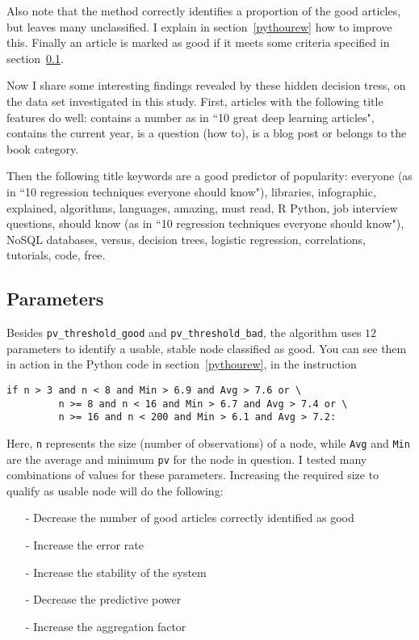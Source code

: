 \documentclass[oneside,10pt]{book}
\begin{document}
\noindent Also note that the method correctly identifies a proportion of the good articles, but leaves many unclassified. I explain in section~\ref{pythourew} 
 how to improve this. Finally an article is marked as good if it meets some criteria specified  in section~\ref{parambana}. 

Now I share some interesting findings revealed by these hidden decision tress, on the data set investigated in this study. First, articles with the following title features do well:
	contains a number as in ``10 great deep learning articles",
	contains the current year,
	is a question  (how to),
	is a blog post or belongs to the book category. 

Then the following title keywords are a good predictor of popularity:
	everyone (as in ``10 regression techniques everyone should know"),
	libraries,
	infographic,
	explained, 
	algorithms,
	languages, 
	amazing, 
	must read,
	R Python,
	job interview questions,
	should know (as in ``10 regression techniques everyone should know"),
	NoSQL databases,
	versus, 
	decision trees,
	logistic regression,
	correlations,
	tutorials,
	code, 
	free. 

\subsection{Parameters}\label{parambana} %

Besides \texttt{pv\_threshold\_good} and \texttt{pv\_threshold\_bad}, the algorithm uses $12$ parameters to identify a usable, stable node classified as good. You can see them in action in the Python code
 in section~\ref{pythourew}, in the instruction

\begin{lstlisting}[frame=none]
     if n > 3 and n < 8 and Min > 6.9 and Avg > 7.6 or \
         n >= 8 and n < 16 and Min > 6.7 and Avg > 7.4 or \
         n >= 16 and n < 200 and Min > 6.1 and Avg > 7.2:
\end{lstlisting}


\noindent Here, \texttt{n} represents the size (number of observations) of a node, while \texttt{Avg} and \texttt{Min} are the average and minimum \texttt{pv} for the node in question.  I tested many combinations of values for these parameters. Increasing the required size to qualify as usable node will do the following:\vspace{1ex}
\begin{itemize}
	\item[-] Decrease the number of good articles correctly identified as good
	\item[-] Increase the error rate
	\item[-] Increase the stability of the system
	\item[-] Decrease the predictive power
	\item[-] Increase the aggregation factor
\end{itemize}\vspace{1ex}
\end{document}
